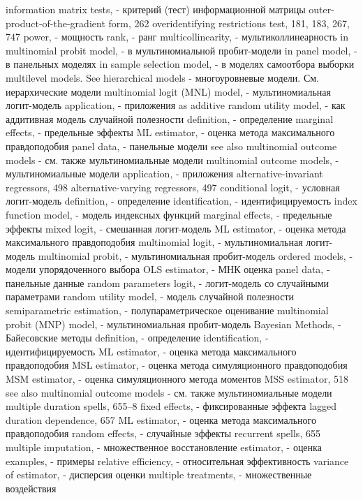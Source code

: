 information matrix tests, - критерий (тест) информационной матрицы
outer-product-of-the-gradient form, 262 
overidentifying restrictions test, 181, 183, 267,
747 
power, - мощность
rank, - ранг
multicollinearity, - мультиколлинеарность
in multinomial probit model, - в мультиномиальной пробит-модели
in panel model, - в панельных моделях
in sample selection model, - в моделях самоотбора выборки
multilevel models. See hierarchical models - многоуровневые модели. См. иерархические модели
multinomial logit (MNL) model, - мультиномиальная логит-модель
application, - приложения
as additive random utility model, - как аддитивная модель случайной полезности
definition, - определение
marginal effects, - предельные эффекты
ML estimator, - оценка метода максимального правдоподобия
panel data, - панельные модели
see also multinomial outcome models - см. также мультиномиальные модели
multinomial outcome models, - мультиномиальные модели
application, - приложения
alternative-invariant regressors, 498 alternative-varying regressors, 497 
conditional logit, - условная логит-модель
definition, - определение
identification, - идентифицируемость
index function model, - модель индексных функций
marginal effects, - предельные эффекты 
mixed logit, - смешанная логит-модель
ML estimator, - оценка метода максимального правдоподобия
multinomial logit, - мультиномиальная логит-модель
multinomial probit, - мультиномиальная пробит-модель
ordered models, - модели упорядоченного выбора
OLS estimator, - МНК оценка
panel data, - панельные данные
random parameters logit, - логит-модель со случайными параметрами
random utility model, - модель случайной полезности
semiparametric estimation, - полупараметрическое оценивание
multinomial probit (MNP) model, - мультиномиальная пробит-модель
Bayesian Methods, - Байесовские методы
definition, - определение
identification, - идентифицируемость
ML estimator, - оценка метода максимального правдоподобия
MSL estimator, - оценка метода симуляционного правдоподобия
MSM estimator, - оценка симуляционного метода моментов
MSS estimator, 518
see also multinomial outcome models - см. также мультиномиальные модели
multiple duration spells, 655–8 
fixed effects, - фиксированные эффекта
lagged duration dependence, 657 
ML estimator, - оценка метода максимального правдоподобия
random effects, - случайные эффекты
recurrent spells, 655 
multiple imputation, - множественное восстановление
estimator, - оценка
examples, - примеры
relative efficiency, - относительная эффективность 
variance of estimator, - дисперсия оценки
multiple treatments, - множественные воздействия
